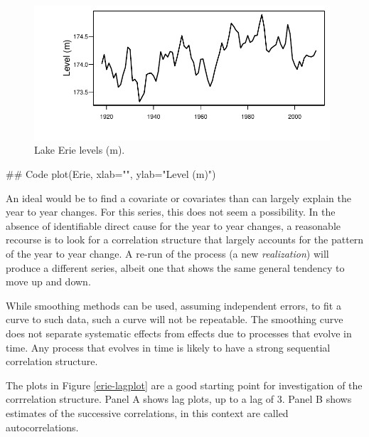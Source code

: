 \begin{figure}
\begin{Schunk}


\centerline{\includegraphics[width=0.98\textwidth]{figs/12-Erie1-1} }

\end{Schunk}
\caption{Lake Erie levels (m).
}\label{fig:erie}
\end{figure}
\begin{marginfigure}[-7cm]
\begin{Schunk}
\begin{Sinput}
## Code
plot(Erie, xlab="",
     ylab="Level (m)")
\end{Sinput}
\end{Schunk}
\end{marginfigure}

An ideal would be to find a covariate or covariates than can largely
explain the year to year changes.  For this series, this does not seem
a possibility.  In the absence of identifiable direct cause for the
year to year changes, a reasonable recourse is to look for a
correlation structure that largely accounts for the pattern of the
year to year change.  A re-run of the process (a new {\em
  realization}) will produce a different series, albeit one that shows
the same general tendency to move up and down.

While smoothing methods can be used, assuming independent errors, to
fit a curve to such data, such a curve will not be repeatable.  The
smoothing curve does not separate systematic effects from effects due
to processes that evolve in time.  Any process that evolves in time is
likely to have a strong sequential correlation structure.

The plots in Figure \ref{erie-lagplot} are a good starting point for
investigation of the corrrelation structure.  Panel A shows lag plots,
up to a lag of 3.  Panel B shows estimates of the successive
correlations, in this context are called autocorrelations.
\vspace*{-12pt}

